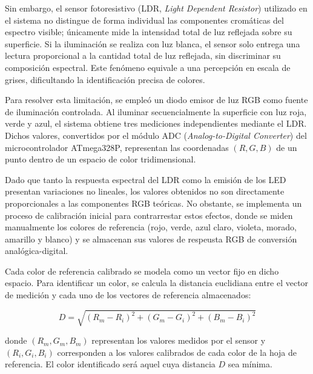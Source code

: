     \vspace{1em}

    Sin embargo, el sensor fotoresistivo (LDR, \textit{Light Dependent Resistor}) utilizado en el sistema no distingue de forma individual las componentes cromáticas del espectro visible; únicamente mide la intensidad total de luz reflejada sobre su superficie. Si la iluminación se realiza con luz blanca, el sensor solo entrega una lectura proporcional a la cantidad total de luz reflejada, sin discriminar su composición espectral. Este fenómeno equivale a una percepción en escala de grises, dificultando la identificación precisa de colores.

    \vspace{1em}

    Para resolver esta limitación, se empleó un diodo emisor de luz RGB como fuente de iluminación controlada. Al iluminar secuencialmente la superficie con luz roja, verde y azul, el sistema obtiene tres mediciones independientes mediante el LDR. Dichos valores, convertidos por el módulo ADC (\textit{Analog-to-Digital Converter}) del microcontrolador ATmega328P, representan las coordenadas $(R, G, B)$ de un punto dentro de un espacio de color tridimensional.

    \vspace{1em}

    Dado que tanto la respuesta espectral del LDR como la emisión de los LED presentan variaciones no lineales, los valores obtenidos no son directamente proporcionales a las componentes RGB teóricas. No obstante, se implementa un proceso de calibración inicial para contrarrestar estos efectos, donde se miden manualmente los colores de referencia (rojo, verde, azul claro, violeta, morado, amarillo y blanco) y se almacenan sus valores de respeusta RGB de conversión analógica-digital.

    \vspace{1em}

    Cada color de referencia calibrado se modela como un vector fijo en dicho espacio. Para identificar un color, se calcula la distancia euclidiana entre el vector de medición y cada uno de los vectores de referencia almacenados:

    \begin{equation}\label{eq:distancia_color}
    D = \sqrt{(R_m - R_i)^2 + (G_m - G_i)^2 + (B_m - B_i)^2}
    \end{equation}

    donde $(R_m, G_m, B_m)$ representan los valores medidos por el sensor y $(R_i, G_i, B_i)$ corresponden a los valores calibrados de cada color de la hoja de referencia. El color identificado será aquel cuya distancia $D$ sea mínima.

